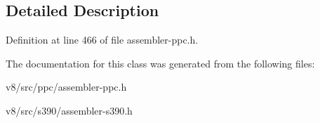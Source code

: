 \subsection{Detailed Description}


Definition at line 466 of file assembler-\/ppc.\+h.



The documentation for this class was generated from the following files\+:\begin{DoxyCompactItemize}
\item 
v8/src/ppc/assembler-\/ppc.\+h\item 
v8/src/s390/assembler-\/s390.\+h\end{DoxyCompactItemize}
